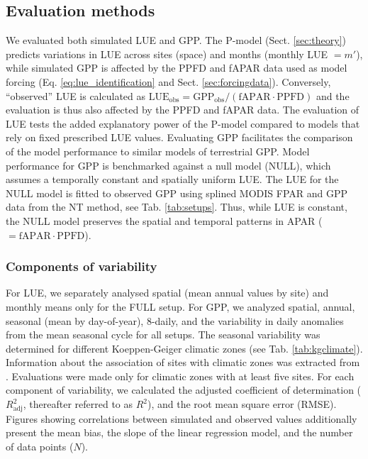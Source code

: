 \documentclass{myreport}
\begin{document}
\subsection{Evaluation methods}
\label{sec:methods_eval}

We evaluated both simulated LUE and GPP. The P-model  (Sect. \ref{sec:theory}) predicts variations in LUE across sites (space) and months (monthly LUE $= m'$), while simulated GPP is affected by the PPFD and fAPAR data used as model forcing (Eq. \ref{eq:lue_identification} and Sect. \ref{sec:forcingdata}). Conversely, ``observed'' LUE is calculated as $\text{LUE}_\text{obs} = \text{GPP}_\text{obs} / (\text{fAPAR} \cdot \text{PPFD})$ and the evaluation is thus also affected by the PPFD and fAPAR data. The evaluation of LUE tests the added explanatory power of the P-model compared to models that rely on fixed prescribed LUE values. Evaluating GPP facilitates the comparison of the model performance to similar models of terrestrial GPP. Model performance for GPP is benchmarked against a null model (NULL), which assumes a temporally constant and spatially uniform LUE. The LUE for the NULL model is fitted to observed GPP using splined MODIS FPAR and GPP data from the NT method, see Tab. \ref{tab:setups}. Thus, while LUE is constant, the NULL model preserves the spatial and temporal patterns in APAR ($= \text{fAPAR} \cdot \text{PPFD}$).

\subsubsection{Components of variability}
\label{sec:evalmethod_variability}
For LUE, we separately analysed spatial (mean annual values by site) and monthly means only for the FULL setup. For GPP, we analyzed spatial, annual, seasonal (mean by day-of-year), 8-daily, and the variability in daily anomalies from the mean seasonal cycle for all setups. The seasonal variability was determined for different Koeppen-Geiger climatic zones (see Tab. \ref{tab:kgclimate}). Information about the association of sites with climatic zones was extracted from \citet{falge17}. Evaluations were made only for climatic zones with at least five sites. For each component of variability, we calculated the adjusted coefficient of determination ($R^2_\text{adj}$, thereafter referred to as $R^2$), and the root mean square error (RMSE). Figures showing correlations between simulated and observed values additionally present the mean bias, the slope of the linear regression model, and the number of data points ($N$).
\end{document}

